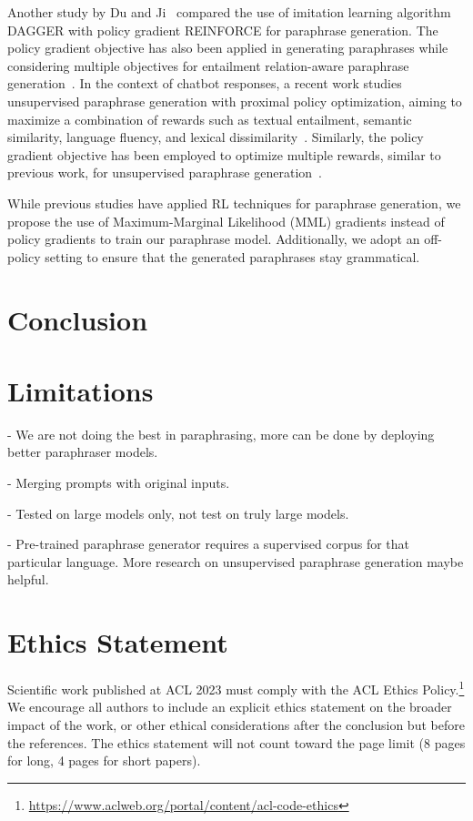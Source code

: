 \documentclass[11pt]{article}
\begin{document}
Another study by Du and Ji~\cite{du-ji-2019-empirical} compared the use of imitation learning algorithm DAGGER with policy gradient REINFORCE for paraphrase generation. The policy gradient objective has also been applied in generating paraphrases while considering multiple objectives for entailment relation-aware paraphrase generation~\cite{Sancheti_Srinivasan_Rudinger_2022}. In the context of chatbot responses, a recent work studies unsupervised paraphrase generation with proximal policy optimization, aiming to maximize a combination of rewards such as textual entailment, semantic similarity, language fluency, and lexical dissimilarity~\cite{DBLP:journals/corr/abs-2103-12777}. Similarly, the policy gradient objective has been employed to optimize multiple rewards, similar to previous work, for unsupervised paraphrase generation~\cite{10.1145/3394486.3403231}.

While previous studies have applied RL techniques for paraphrase generation, we propose the use of Maximum-Marginal Likelihood (MML) gradients instead of policy gradients to train our paraphrase model. Additionally, we adopt an off-policy setting to ensure that the generated paraphrases stay grammatical.

\section{Conclusion}


\section{Limitations}
- We are not doing the best in paraphrasing, more can be done by deploying better paraphraser models.

- Merging prompts with original inputs.

- Tested on large models only, not test on truly large models.

- Pre-trained paraphrase generator requires a supervised corpus for that particular language. More research on unsupervised paraphrase generation maybe helpful.

\section*{Ethics Statement}
Scientific work published at ACL 2023 must comply with the ACL Ethics Policy.\footnote{\url{https://www.aclweb.org/portal/content/acl-code-ethics}} We encourage all authors to include an explicit ethics statement on the broader impact of the work, or other ethical considerations after the conclusion but before the references. The ethics statement will not count toward the page limit (8 pages for long, 4 pages for short papers).
\end{document}
